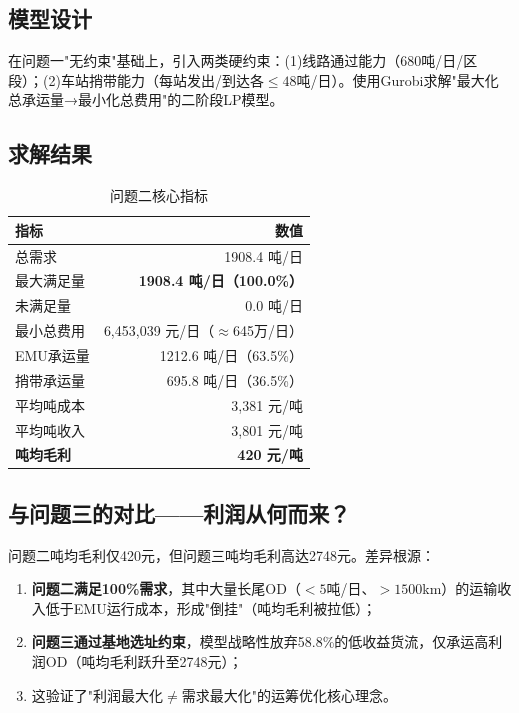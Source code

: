 \documentclass[12pt,a4paper,fontset=none]{ctexart}
\begin{document}
\subsection{模型设计}
在问题一"无约束"基础上，引入两类硬约束：(1)线路通过能力（680吨/日/区段）；(2)车站捎带能力（每站发出/到达各$\le48$吨/日）。使用Gurobi求解"最大化总承运量→最小化总费用"的二阶段LP模型。

\subsection{求解结果}

\begin{table}[H]\centering\small
\caption{问题二核心指标}\label{tab:p2}
\begin{tabular}{lr}
\toprule
指标 & 数值 \\
\midrule
总需求 & 1908.4 吨/日 \\
\rowcolor{green!5}
最大满足量 & \textbf{1908.4 吨/日（100.0\%）} \\
未满足量 & 0.0 吨/日 \\
最小总费用 & 6,453,039 元/日（$\approx$645万/日） \\
\midrule
EMU承运量 & 1212.6 吨/日（63.5\%） \\
捎带承运量 & 695.8 吨/日（36.5\%） \\
\midrule
平均吨成本 & 3,381 元/吨 \\
平均吨收入 & 3,801 元/吨 \\
\rowcolor{red!5}
\textbf{吨均毛利} & \textbf{420 元/吨} \\
\bottomrule
\end{tabular}
\end{table}

\subsection{与问题三的对比——利润从何而来？}

问题二吨均毛利仅420元，但问题三吨均毛利高达2748元。差异根源：

\begin{enumerate}
    \item \textbf{问题二满足100\%需求}，其中大量长尾OD（$<5$吨/日、$>1500$km）的运输收入低于EMU运行成本，形成"倒挂"（吨均毛利被拉低）；
    \item \textbf{问题三通过基地选址约束}，模型战略性放弃58.8\%的低收益货流，仅承运高利润OD（吨均毛利跃升至2748元）；
    \item 这验证了"利润最大化$\neq$需求最大化"的运筹优化核心理念。
\end{enumerate}
\end{document}
